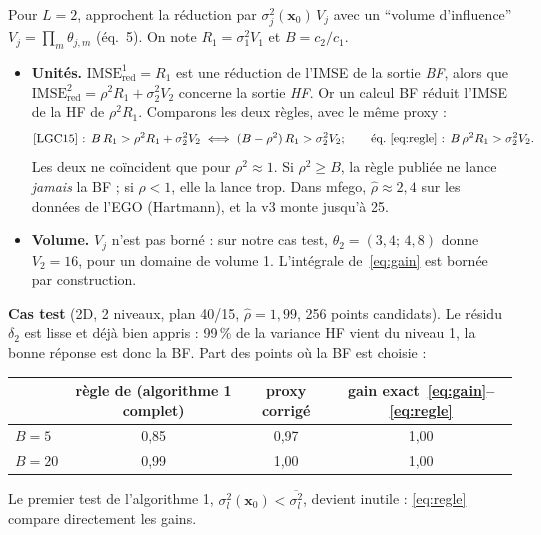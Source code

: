 \documentclass[10pt,a4paper]{article}
\theoremstyle{plain}
\newcommand{\vx}{\bm{x}}
\begin{document}
\begin{aretenir}
Pour $L=2$, \cite{LGC15} approchent la réduction par $\sigma_j^2(\vx_0)\,V_j$ avec un \enquote{volume
d'influence} $V_j=\prod_m\theta_{j,m}$ (éq.~5). On note $R_1=\sigma_1^2V_1$ et $B=c_2/c_1$.
\begin{itemize}
  \item \textbf{Unités.} $\mathrm{IMSE}^1_{\mathrm{red}}=R_1$ est une réduction de l'IMSE de la sortie
        \emph{BF}, alors que $\mathrm{IMSE}^2_{\mathrm{red}}=\rho^2R_1+\sigma_2^2V_2$ concerne la sortie
        \emph{HF}. Or un calcul BF réduit l'IMSE de la HF de $\rho^2R_1$. Comparons les deux règles, avec le
        même proxy :
        \[
          \text{\cite{LGC15} : } B\,R_1>\rho^2R_1+\sigma_2^2V_2\iff(B-\rho^2)\,R_1>\sigma_2^2V_2;
          \qquad
          \text{éq.~\eqref{eq:regle} : } B\,\rho^2R_1>\sigma_2^2V_2 .
        \]
        Les deux ne coïncident que pour $\rho^2\approx1$. Si $\rho^2\ge B$, la règle publiée ne lance
        \emph{jamais} la BF ; si $\rho<1$, elle la lance trop. Dans mfego, $\hat\rho\approx2{,}4$ sur les
        données de l'EGO (Hartmann), et la v3 monte jusqu'à 25.
  \item \textbf{Volume.} $V_j$ n'est pas borné : sur notre cas test, $\theta_2=(3{,}4;\,4{,}8)$ donne
        $V_2=16$, pour un domaine de volume 1. L'intégrale de~\eqref{eq:gain} est bornée par construction.
\end{itemize}
\textbf{Cas test} (2D, 2 niveaux, plan 40/15, $\hat\rho=1{,}99$, 256 points candidats). Le résidu $\delta_2$
est lisse et déjà bien appris : 99\,\% de la variance HF vient du niveau 1, la bonne réponse est donc la BF.
Part des points où la BF est choisie :
\begin{center}\small
\begin{tabular}{lccc}
\toprule
 & règle de \cite{LGC15} (algorithme 1 complet) & proxy corrigé & gain exact~\eqref{eq:gain}–\eqref{eq:regle}\\
\midrule
$B=5$  & 0,85 & 0,97 & 1,00\\
$B=20$ & 0,99 & 1,00 & 1,00\\
\bottomrule
\end{tabular}
\end{center}
Le premier test de l'algorithme 1, $\sigma^2_l(\vx_0)<\overline{\sigma^2_l}$, devient inutile :
\eqref{eq:regle} compare directement les gains.
\end{aretenir}

\end{document}
